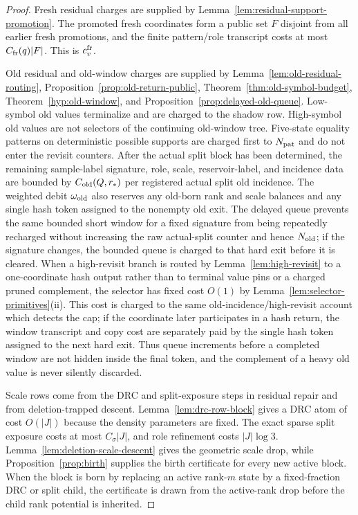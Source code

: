 \documentclass[11pt]{article}
\begin{document}
\begin{proof}
Fresh residual charges are supplied by
Lemma~\ref{lem:residual-support-promotion}.  The promoted fresh coordinates
form a public set $F$ disjoint from all earlier fresh promotions, and the
finite pattern/role transcript costs at most $C_{\rm fr}(q)|F|$.  This is
$c_v^{\rm fr}$.

Old residual and old-window charges are supplied by
Lemma~\ref{lem:old-residual-routing}, Proposition~\ref{prop:old-return-public},
Theorem~\ref{thm:old-symbol-budget}, Theorem~\ref{hyp:old-window}, and
Proposition~\ref{prop:delayed-old-queue}.  Low-symbol old values terminalize
and are charged to the shadow row.  High-symbol old values are not selectors
of the continuing old-window tree.  Five-state equality patterns on
deterministic possible supports are charged first to $N_{\rm pat}$ and do not
enter the revisit counters.  After the actual split block has been determined,
the remaining sample-label signature, role, scale, reservoir-label, and
incidence data are bounded by $C_{\rm old}(Q,r_*)$ per registered actual split
old incidence.  The weighted debit $\omega_{\rm old}$ also reserves any
old-born rank and scale balances and any single hash token assigned to the
nonempty old exit.  The delayed queue prevents the same bounded short window
for a fixed signature from being repeatedly recharged without increasing the
raw actual-split counter and hence $N_{\rm old}$; if the signature changes, the
bounded queue is charged to that hard exit before it is cleared.
When a high-revisit branch is routed by Lemma~\ref{lem:high-revisit} to a
one-coordinate hash output rather than to terminal value pins or a charged
pruned complement, the selector has fixed cost $O(1)$ by
Lemma~\ref{lem:selector-primitives}(ii).  This cost is charged to the same
old-incidence/high-revisit account which detects the cap; if the coordinate
later participates in a hash return, the window transcript and copy cost are
separately paid by the single hash token assigned to the next hard exit.  Thus
queue increments before a completed window are not hidden inside the final
token, and the complement of a heavy old value is never silently discarded.

Scale rows come from the DRC and split-exposure steps in residual repair and
from deletion-trapped descent.  Lemma~\ref{lem:drc-row-block} gives a DRC atom
of cost $O(|J|)$ because the density parameters are fixed.  The exact sparse
split exposure costs at most $C_\sigma |J|$, and role refinement costs
$|J|\log 3$.  Lemma~\ref{lem:deletion-scale-descent} gives the geometric
scale drop, while Proposition~\ref{prop:birth} supplies the birth certificate
for every new active block.  When the block is born by replacing an active
rank-$m$ state by a fixed-fraction DRC or split child, the certificate is drawn
from the active-rank drop before the child rank potential is inherited.


\end{proof}
\end{document}
